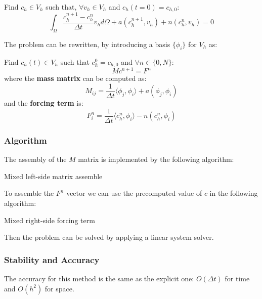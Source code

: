 \documentclass[12pt, letterpaper]{article}
\begin{document}
\vspace{1em}
\noindent
Find $c_h\in V_h$ such that, $\forall v_h\in V_h$ and $c_h(t=0)=c_{h,0}$:
$$\int_\Omega\frac{c_h^{n+1}-c_h^n}{\Delta t}v_hd\Omega+a(c_h^{n+1},v_h)+n(c_h^n,v_h)=0$$

\noindent The problem can be rewritten, by introducing a basis $\{\phi_i\}$ for $V_h$ as:

\vspace{1em}
\noindent
Find $c_h(t)\in V_h$ such that $c_h^0=c_{h,0}$ and $\forall n\in\{0, N\}$:
$$Mc^{n+1}=F^n$$
where the \textbf{mass matrix} can be computed as:
$$M_{ij}=\frac1{\Delta t}\langle\phi_j,\phi_i\rangle+a(\phi_j,\phi_i)$$
and the \textbf{forcing term} is:
$$F_i^n=\frac1{\Delta t}\langle c_h^n,\phi_i\rangle-n(c_h^n,\phi_i)$$

\subsubsection{Algorithm}
The assembly of the $M$ matrix is implemented by the following algorithm:

\begin{algorithm}
    \caption{Mixed left-side matrix assemble}

\end{algorithm}

To assemble the $F^n$ vector we can use the precomputed value of $c$ in the following algorithm:

\pagebreak

\begin{algorithm}
    \caption{Mixed right-side forcing term}

\end{algorithm}

\noindent Then the problem can be solved by applying a linear system solver.

\subsubsection{Stability and Accuracy}
The accuracy for this method is the same as the explicit one: $O(\Delta t)$ for time and $O(h^2)$ for space.
\end{document}
